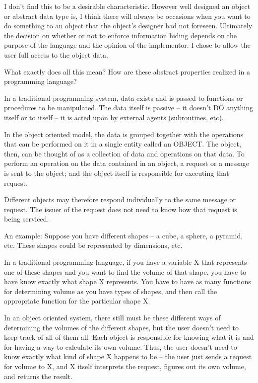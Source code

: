 I don't find this to be a desirable characteristic.  However well
designed an object or abstract data type is, I think there will always be
occasions when you want to do something to an object that the object's
designer had not foreseen.  Ultimately the decision on whether or not
to enforce information hiding depends on the purpose of the language
and the opinion of the implementor.  I chose to allow the user
full access to the object data.



What exactly does all this mean?
How are these abstract properties realized in a programming language?

In a traditional programming system, data exists and is passed to
functions or procedures to be manipulated.  The data itself is passive -- it
doesn't DO anything itself or to itself -- it is acted upon by external
agents (subroutines, etc).

In the object oriented model, the data is grouped together with the
operations that can be performed on it in a single entity called an
OBJECT.  The object, then, can be thought of as a collection of data and
operations on that data.  To perform an operation on the data contained in
an object, a request or a message is sent to the object; and the object
itself is responsible for executing that request.

Different objects may therefore respond individually to the same message or
request.  The issuer of the request does not need to know how that request
is being serviced.

An example:  Suppose you have different shapes -- a cube, a sphere, a
pyramid, etc.  These shapes could be represented by dimensions, etc.

In a traditional programming language, if you have a variable X that
represents one of these shapes and you want to find the volume of 
that shape, you have to have know exactly what shape X represents.
You have to have as many functions for determining volume as you
have types of shapes, and then call the appropriate function for
the particular shape X.

In an object oriented system, there still must be these different ways of
determining the volumes of the different shapes, but the user doesn't need
to keep track of all of them all.  Each object is responsible for knowing
what it is and for having a way to calculate its own volume.  Thus,
the user doesn't need to know exactly what kind of shape X happens to be --
the user just sends a request for volume to X, and X itself interprets the
request, figures out its own volume, and returns the result.

